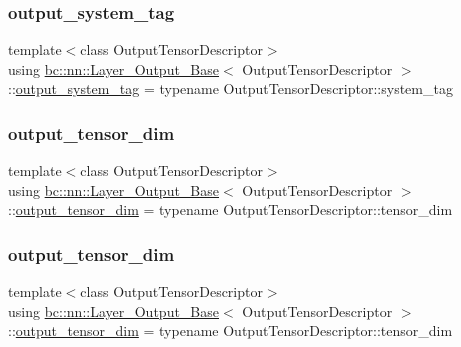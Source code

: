\subsubsection{\texorpdfstring{output\+\_\+system\+\_\+tag}{output\_system\_tag}\hspace{0.1cm}{\footnotesize\ttfamily [2/2]}}
{\footnotesize\ttfamily template$<$class Output\+Tensor\+Descriptor$>$ \\
using \hyperlink{structbc_1_1nn_1_1Layer__Output__Base}{bc\+::nn\+::\+Layer\+\_\+\+Output\+\_\+\+Base}$<$ Output\+Tensor\+Descriptor $>$\+::\hyperlink{structbc_1_1nn_1_1Layer__Output__Base_ab95900f0cbd689cd1d2c187ac8d4ddd0}{output\+\_\+system\+\_\+tag} =  typename Output\+Tensor\+Descriptor\+::system\+\_\+tag}

\mbox{\label{structbc_1_1nn_1_1Layer__Output__Base_a52a461f65c3b8ae04ae445723a334e13}} 
\subsubsection{\texorpdfstring{output\+\_\+tensor\+\_\+dim}{output\_tensor\_dim}\hspace{0.1cm}{\footnotesize\ttfamily [1/2]}}
{\footnotesize\ttfamily template$<$class Output\+Tensor\+Descriptor$>$ \\
using \hyperlink{structbc_1_1nn_1_1Layer__Output__Base}{bc\+::nn\+::\+Layer\+\_\+\+Output\+\_\+\+Base}$<$ Output\+Tensor\+Descriptor $>$\+::\hyperlink{structbc_1_1nn_1_1Layer__Output__Base_a52a461f65c3b8ae04ae445723a334e13}{output\+\_\+tensor\+\_\+dim} =  typename Output\+Tensor\+Descriptor\+::tensor\+\_\+dim}

\mbox{\label{structbc_1_1nn_1_1Layer__Output__Base_a52a461f65c3b8ae04ae445723a334e13}} 
\subsubsection{\texorpdfstring{output\+\_\+tensor\+\_\+dim}{output\_tensor\_dim}\hspace{0.1cm}{\footnotesize\ttfamily [2/2]}}
{\footnotesize\ttfamily template$<$class Output\+Tensor\+Descriptor$>$ \\
using \hyperlink{structbc_1_1nn_1_1Layer__Output__Base}{bc\+::nn\+::\+Layer\+\_\+\+Output\+\_\+\+Base}$<$ Output\+Tensor\+Descriptor $>$\+::\hyperlink{structbc_1_1nn_1_1Layer__Output__Base_a52a461f65c3b8ae04ae445723a334e13}{output\+\_\+tensor\+\_\+dim} =  typename Output\+Tensor\+Descriptor\+::tensor\+\_\+dim}

